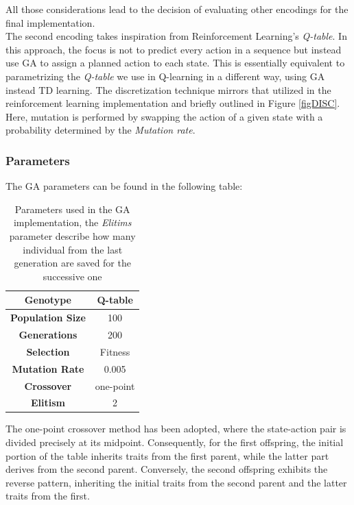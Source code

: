 All those considerations lead to the decision of evaluating other encodings for the final implementation.\\

The second encoding takes inspiration from Reinforcement Learning's \textit{Q-table}.
In this approach, the focus is not to predict every action in a sequence but instead use GA to assign a planned action to each state. 
This is essentially equivalent to parametrizing the \textit{Q-table} we use in Q-learning in a different way, using GA instead TD learning.
The discretization technique mirrors that utilized in the reinforcement learning implementation and briefly outlined in Figure \ref{figDISC}.\\
Here, mutation is performed by swapping the action of a given state with a probability determined by the \textit{Mutation rate}.


\subsubsection{Parameters}
The GA parameters can be found in the following table:
\begin{table}[H]%
	\centering
	\begin{tabular}{|S|S|} 		%
		
		\hline
		{\textbf{Genotype}} &  {Q-table} \\
		\hline
		{\textbf{Population Size}} & {100} \\
		\hline
		{\textbf{Generations}} & {200} \\
		\hline
		{\textbf{Selection}}  & {Fitness} \\
		\hline
		{\textbf{Mutation Rate}} & {0.005} \\
		\hline
		{\textbf{Crossover}}& {one-point} \\
		\hline
		{\textbf{Elitism}}&  {2}  \\
		\hline

	\end{tabular}
	\caption{Parameters used in the GA implementation, the \textit{Elitims} parameter describe how many individual from the last generation are saved for the successive one}
	\label{tab:GA_parameters}
\end{table}

The one-point crossover method has been adopted, where the state-action pair is divided precisely at its midpoint. 
Consequently, for the first offspring, the initial portion of the table inherits traits from the first parent, while the latter part derives from the second parent. Conversely, the second offspring exhibits the reverse pattern, inheriting the initial traits from the second parent and the latter traits from the first.

